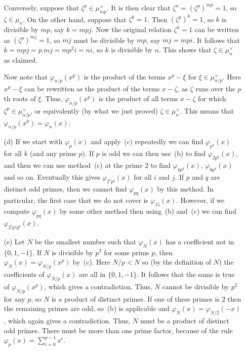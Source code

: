 \documentclass{amsart}
\newcommand{\zt}        {\zeta}
\newcommand{\vph}       {\varphi}
\newcommand{\tm}        {\times}
\renewcommand{\:}{\colon}
\newenvironment{solution}{\SolutionInline}{\endSolutionInline}
\theoremstyle{definition}
\renewenvironment{solution}{\SolutionAtEnd}{\endSolutionAtEnd}
\begin{document}
\begin{solution}
\begin{itemize}
   Conversely, suppose that $\zt^p\in\mu_{mp}^\tm$.  It is then clear
   that $\zt^n=(\zt^p)^{mp}=1$, so $\zt\in\mu_n$.  On the other hand,
   suppose that $\zt^k=1$.  Then $(\zt^p)^k=1$, so $k$ is divisible by
   $mp$, say $k=mpj$.  Now the original relation $\zt^k=1$ can be
   written as $(\zt^p)^{mj}=1$, so $mj$ must be divisible by $mp$, say
   $mj=mpi$.  It follows that $k=mpj=p.mj=mp^2i=ni$, so $k$ is
   divisible by $n$.  This shows that $\zt\in\mu_n^\tm$ as claimed.

   Now note that $\vph_{n/p}(x^p)$ is the product of the terms
   $x^p-\xi$ for $\xi\in\mu^\tm_{n/p}$.  Here $x^p-\xi$ can be
   rewritten as the product of the terms $x-\zt$, as $\zt$ runs over
   the $p$th roots of $\xi$.  Thus, $\vph_{n/p}(x^p)$ is the product
   of all terms $x-\zt$ for which $\zt^p\in\mu_{n/p}^\tm$, or
   equivalently (by what we just proved) $\zt\in\mu_n^\tm$.  This
   means that $\vph_{n/p}(x^p)=\vph_n(x)$.

  \item[(d)] If we start with $\vph_p(x)$ and apply~(c) repeatedly we
   can find $\vph_{p^k}(x)$ for all $k$ (and any prime $p$).  If $p$
   is odd we can then use~(b) to find $\vph_{2p^k}(x)$, and then we
   can use method~(c) at the prime $2$ to find $\vph_{4p^k}(x)$,
   $\vph_{8p^k}(x)$ and so on.  Eventually this gives
   $\vph_{2^ip^j}(x)$ for all $i$ and $j$.  If $p$ and $q$ are
   distinct odd primes, then we cannot find $\vph_{pq}(x)$ by this
   method.  In particular, the first case that we do not cover is
   $\vph_{15}(x)$.  However, if we compute $\vph_{pq}(x)$ by some
   other method then using~(b) and~(c) we can find
   $\vph_{2^ip^jq^k}(x)$.  

  \item[(e)] Let $N$ be the smallest number such that $\vph_N(x)$ has
   a coefficient not in $\{0,1,-1\}$.  If $N$ is divisible by $p^2$
   for some prime $p$, then $\vph_N(x)=\vph_{N/p}(x^p)$ by~(c).  Here
   $N/p<N$ so (by the definition of $N$) the coefficients of
   $\vph_{N/p}(x)$ are all in $\{0,1,-1\}$.  It follows that the same
   is true of $\vph_{N/p}(x^p)$, which gives a contradiction.  Thus,
   $N$ cannot be divisible by $p^2$ for any $p$, so $N$ is a product
   of distinct primes.  If one of these primes is $2$ then the
   remaining primes are odd, so~(b) is applicable and
   $\vph_N(x)=\vph_{N/2}(-x)$, which again gives a contradiction.
   Thus, $N$ must be a product of distinct odd primes.  There must be
   more than one prime factor, because of the rule
   $\vph_p(x)=\sum_{i=0}^{p-1}x^i$. 


\end{itemize}
\end{solution}
\end{document}
